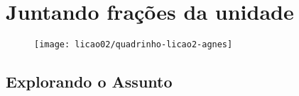 
\chapter{Juntando frações da unidade}

\null\vfill
\begin{figure}[H]
\centering








\texttt{[image: licao02/quadrinho-licao2-agnes]}
\end{figure}
\vfill\null
\newpage

\section{Explorando o Assunto}

